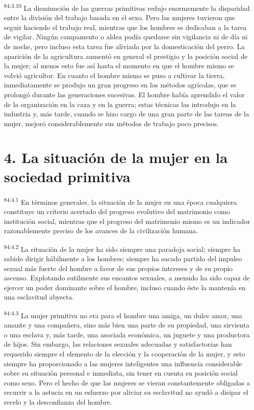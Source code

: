 \documentclass[twoside, 11pt]{book}
\begin{document}
\par
\textsuperscript{84:3.10} La disminución de las guerras primitivas redujo enormemente la disparidad entre la división del trabajo basada en el sexo. Pero las mujeres tuvieron que seguir haciendo el trabajo real, mientras que los hombres se dedicaban a la tarea de vigilar. Ningún campamento o aldea podía quedarse sin vigilancia ni de día ni de noche, pero incluso esta tarea fue aliviada por la domesticación del perro. La aparición de la agricultura aumentó en general el prestigio y la posición social de la mujer; al menos esto fue así hasta el momento en que el hombre mismo se volvió agricultor. En cuanto el hombre mismo se puso a cultivar la tierra, inmediatamente se produjo un gran progreso en los métodos agrícolas, que se prolongó durante las generaciones sucesivas. El hombre había aprendido el valor de la organización en la caza y en la guerra; estas técnicas las introdujo en la industria y, más tarde, cuando se hizo cargo de una gran parte de las tareas de la mujer, mejoró considerablemente sus métodos de trabajo poco precisos.

\section*{4. La situación de la mujer en la sociedad primitiva}
\par
\textsuperscript{84:4.1} En términos generales, la situación de la mujer en una época cualquiera constituye un criterio acertado del progreso evolutivo del matrimonio como institución social, mientras que el progreso del matrimonio mismo es un indicador razonablemente preciso de los avances de la civilización humana.

\par
\textsuperscript{84:4.2} La situación de la mujer ha sido siempre una paradoja social; siempre ha sabido dirigir hábilmente a los hombres; siempre ha sacado partido del impulso sexual más fuerte del hombre a favor de sus propios intereses y de su propio ascenso. Explotando sutilmente sus encantos sexuales, a menudo ha sido capaz de ejercer un poder dominante sobre el hombre, incluso cuando éste la mantenía en una esclavitud abyecta.

\par
\textsuperscript{84:4.3} La mujer primitiva no era para el hombre una amiga, un dulce amor, una amante y una compañera, sino más bien una parte de su propiedad, una sirvienta o una esclava y, más tarde, una asociada económica, un juguete y una productora de hijos. Sin embargo, las relaciones sexuales adecuadas y satisfactorias han requerido siempre el elemento de la elección y la cooperación de la mujer, y esto siempre ha proporcionado a las mujeres inteligentes una influencia considerable sobre su situación personal e inmediata, sin tener en cuenta su posición social como sexo. Pero el hecho de que las mujeres se vieran constantemente obligadas a recurrir a la astucia en un esfuerzo por aliviar su esclavitud no ayudó a disipar el recelo y la desconfianza del hombre.
\end{document}

